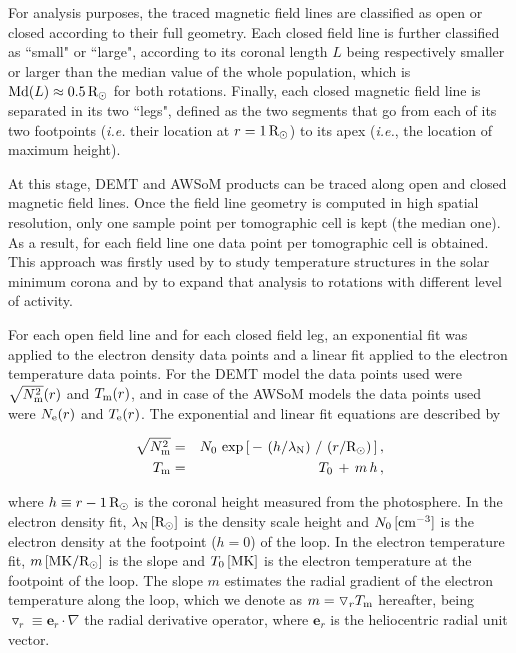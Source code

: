 \documentclass[namedreferences]{solarphysics}
\renewcommand{\l}{\lambda_{\rm N}}%
\newcommand{\mrsun}{{\rm R_\odot}}
\newcommand{\MK}{{\rm MK}}
\newcommand{\cm}{{\rm cm}}
\newcommand{\cminvc}{\cm^{-3}}
\newcommand{\dr}{\triangledown_r}
\newcommand{\er}{\mathbf{e}_r}
\newcommand{\Te}{T_{\rm e}}
\newcommand{\Tm}{T_{\rm m}}
\newcommand{\Ne}{N_{\rm e}}
\newcommand{\Nsqm}{N^2_{{\rm m}}}
\newcommand{\sqravgN}{\sqrt{\Nsqm}}
\begin{document}
\begin{article}
{For analysis purposes, {the traced magnetic field lines are classified as open or closed according to their full geometry. Each closed field} line is further classified as ``small" or ``large", according to its coronal length $L$ being {respectively smaller or larger than the median value of the whole population, which is ${\rm Md}(L)\approx 0.5\,\mrsun$ for both rotations.} Finally, each closed magnetic field line is separated in its two ``legs", defined as the two segments that go from each of its two footpoints (\textit{i.e.} their location at $r=1\,\mrsun$) to its apex (\textit{i.e.}, the location of maximum height).}

At this {stage, DEMT and AWSoM products} can be traced along open and closed magnetic field lines. Once the field line geometry is computed in high spatial resolution, only one sample point per tomographic cell is kept (the median one). 
 As a result, for each field line one data point per tomographic cell {is obtained. This approach} was firstly used by \citet{huang_2012} to {study temperature} structures in the solar minimum {corona and by} \citet{nuevo_2013} to expand that analysis to rotations with different level of activity.

For each open field line and {for each closed field leg}, an exponential fit {was applied} to the electron density {data points} and a linear fit applied to the electron temperature {data points}. For {the DEMT model} the data points used were $\sqravgN(r)$ and $\Tm(r)$, and in case of {the AWSoM models} the data points used were $\Ne(r)$ and $\Te(r)$. The exponential and linear fit equations are described by

\begin{eqnarray}\label{Nfit}
\sqravgN &=& N_0\,\exp{\left[\,-\,\left(h/\l\right)\,/\,\left(r/\mrsun\right)\,\right]} \,,\\
\label{Tfit}
\Tm &=& T_0\,+\,m\,h \,,
\end{eqnarray}

\noindent
where $h \equiv r - 1\,\mrsun$ is the coronal height measured from the photosphere. In the electron density fit, $\l\,[\mrsun]$ is the density scale height and $N_0\,[\cminvc]$ is the electron density at the footpoint ($h=0$) of the loop. In the electron temperature fit, $m\,[\MK/\mrsun]$ is the slope and $T_0\,[\MK]$ is the electron temperature at the footpoint of the loop. The slope $m$ estimates the radial gradient of the electron temperature along the loop, which we denote as $m = \dr\Tm$ hereafter, being $\dr\equiv\er\cdot\nabla$ the radial derivative operator, where $\er$ is the heliocentric radial unit vector.


\end{article}
\end{document}
